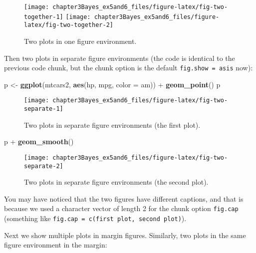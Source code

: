 \documentclass[]{tufte-handout}
\newenvironment{Shaded}{}{}
\newcommand{\KeywordTok}[1]{\textcolor[rgb]{0.00,0.44,0.13}{\textbf{{#1}}}}
\newcommand{\DataTypeTok}[1]{\textcolor[rgb]{0.56,0.13,0.00}{{#1}}}
\newcommand{\StringTok}[1]{\textcolor[rgb]{0.25,0.44,0.63}{{#1}}}
\newcommand{\NormalTok}[1]{{#1}}
\begin{document}
\begin{figure}
\texttt{[image: chapter3Bayes\_ex5and6\_files/figure-latex/fig-two-together-1]} \texttt{[image: chapter3Bayes\_ex5and6\_files/figure-latex/fig-two-together-2]} \caption[Two plots in one figure environment]{Two plots in one figure environment.}\label{fig:fig-two-together}
\end{figure}

Then two plots in separate figure environments (the code is identical to
the previous code chunk, but the chunk option is the default
\texttt{fig.show = \textquotesingle{}asis\textquotesingle{}} now):

\begin{Shaded}
\begin{Highlighting}[]
\NormalTok{p <-}\StringTok{ }\KeywordTok{ggplot}\NormalTok{(mtcars2, }\KeywordTok{aes}\NormalTok{(hp, mpg, }\DataTypeTok{color =} \NormalTok{am)) +}
\StringTok{  }\KeywordTok{geom_point}\NormalTok{()}
\NormalTok{p}
\end{Highlighting}
\end{Shaded}

\begin{figure}
\texttt{[image: chapter3Bayes\_ex5and6\_files/figure-latex/fig-two-separate-1]} \caption[Two plots in separate figure environments (the first plot)]{Two plots in separate figure environments (the first plot).}\label{fig:fig-two-separate1}
\end{figure}

\begin{Shaded}
\begin{Highlighting}[]
\NormalTok{p +}\StringTok{ }\KeywordTok{geom_smooth}\NormalTok{()}
\end{Highlighting}
\end{Shaded}

\begin{figure}
\texttt{[image: chapter3Bayes\_ex5and6\_files/figure-latex/fig-two-separate-2]} \caption[Two plots in separate figure environments (the second plot)]{Two plots in separate figure environments (the second plot).}\label{fig:fig-two-separate2}
\end{figure}

You may have noticed that the two figures have different captions, and
that is because we used a character vector of length 2 for the chunk
option \texttt{fig.cap} (something like
\texttt{fig.cap = c(\textquotesingle{}first plot\textquotesingle{}, \textquotesingle{}second plot\textquotesingle{})}).

Next we show multiple plots in margin figures. Similarly, two plots in
the same figure environment in the margin:
\end{document}
